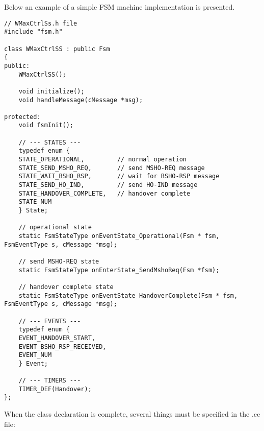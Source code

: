 Below an example of a simple FSM machine implementation is presented. 

\begin{lstlisting}
// WMaxCtrlSs.h file
#include "fsm.h"

class WMaxCtrlSS : public Fsm
{
public:
    WMaxCtrlSS();

    void initialize();
    void handleMessage(cMessage *msg);

protected:
    void fsmInit();

    // --- STATES ---
    typedef enum {
	STATE_OPERATIONAL,         // normal operation
	STATE_SEND_MSHO_REQ,       // send MSHO-REQ message
	STATE_WAIT_BSHO_RSP,       // wait for BSHO-RSP message
	STATE_SEND_HO_IND,         // send HO-IND message
	STATE_HANDOVER_COMPLETE,   // handover complete
	STATE_NUM
    } State;

    // operational state
    static FsmStateType onEventState_Operational(Fsm * fsm, FsmEventType s, cMessage *msg);

    // send MSHO-REQ state
    static FsmStateType onEnterState_SendMshoReq(Fsm *fsm);

    // handover complete state
    static FsmStateType onEventState_HandoverComplete(Fsm * fsm, FsmEventType s, cMessage *msg);

    // --- EVENTS ---
    typedef enum {
	EVENT_HANDOVER_START,
	EVENT_BSHO_RSP_RECEIVED,
	EVENT_NUM
    } Event;

    // --- TIMERS ---
    TIMER_DEF(Handover);
};
\end{lstlisting}

When the class declaration is complete, several things must be
specified in the .cc file:

